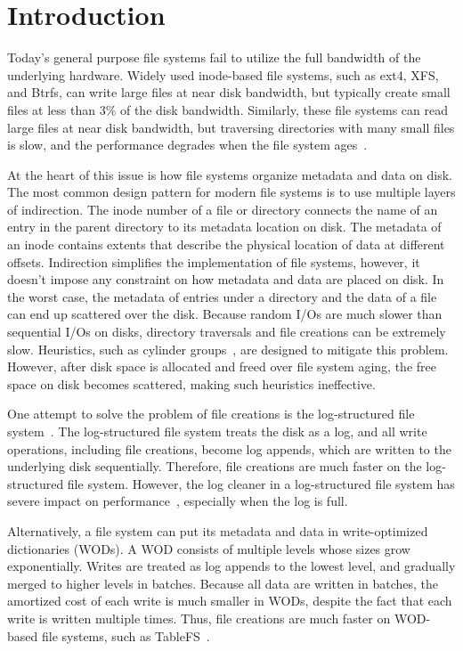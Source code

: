 \chapter{Introduction}
\label{chap:intro}

Today's general purpose file systems fail to utilize the full bandwidth of the
underlying hardware.
Widely used inode-based file systems, such as ext4, XFS, and Btrfs, can write
large files at near disk bandwidth,
but typically create small files at less than 3\% of the disk bandwidth.
Similarly, these file systems can read large files at near disk bandwidth,
but traversing directories with many small files is slow, and the performance
degrades when the file system ages~\citep{betrfs3}.

At the heart of this issue is how file systems organize metadata and data
on disk.
The most common design pattern for modern file systems is to use multiple layers
of indirection.
The inode number of a file or directory connects the name of an entry in the
parent directory to its metadata location on disk.
The metadata of an inode contains extents that describe the physical location
of data at different offsets.
Indirection simplifies the implementation of file systems, however,
it doesn't impose any constraint on how metadata and data are placed on disk.
In the worst case, the metadata of entries under a directory and the data of
a file can end up scattered over the disk.
Because random I/Os are much slower than sequential I/Os on disks,
directory traversals and file creations can be extremely slow.
Heuristics, such as cylinder groups~\citep{ffs1}, are designed to mitigate this
problem.
However, after disk space is allocated and freed over file system aging,
the free space on disk becomes scattered, making such heuristics
ineffective.

One attempt to solve the problem of file creations is the log-structured file
system~\citep{lfs}.
The log-structured file system treats the disk as a log,
and all write operations, including file creations, become log appends,
which are written to the underlying disk sequentially.
Therefore, file creations are much faster on the log-structured file system.
However, the log cleaner in a log-structured file system has severe impact on
performance~\citep{lfsbsd}, especially when the log is full.

Alternatively, a file system can put its metadata and data in write-optimized
dictionaries (WODs).
A WOD consists of multiple levels whose sizes grow exponentially.
Writes are treated as log appends to the lowest level, and gradually merged to
higher levels in batches.
Because all data are written in batches, the amortized cost of each write is
much smaller in WODs,
despite the fact that each write is written multiple times.
Thus, file creations are much faster on WOD-based file systems, such as
TableFS~\citep{tablefs}.


